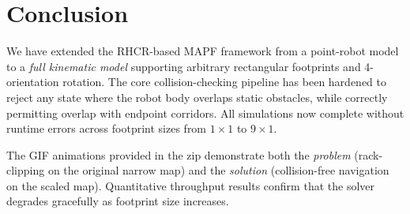 \documentclass[12pt, a4paper]{article}
\begin{document}
\section{Conclusion}

We have extended the RHCR-based MAPF framework from a point-robot model to a \emph{full kinematic model} supporting arbitrary rectangular footprints and 4-orientation rotation. The core collision-checking pipeline has been hardened to reject any state where the robot body overlaps static obstacles, while correctly permitting overlap with endpoint corridors. All simulations now complete without runtime errors across footprint sizes from $1\times1$ to $9\times1$.

The GIF animations provided in the zip demonstrate both the \emph{problem} (rack-clipping on the original narrow map) and the \emph{solution} (collision-free navigation on the scaled map). Quantitative throughput results confirm that the solver degrades gracefully as footprint size increases.
\end{document}
